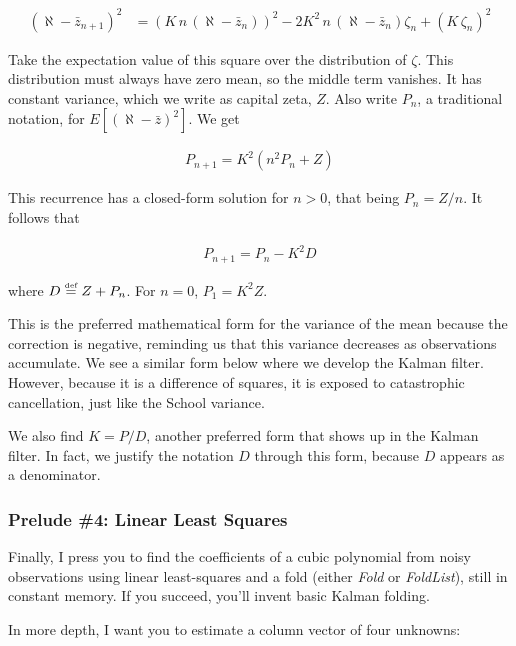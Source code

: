\documentclass[10pt,oneside,x11names]{article}
\begin{document}
\begin{enumerate}
\begin{align*}
(\aleph-\bar{z}_{n+1})^2
&=
\left(
K\, n\, (\aleph - \bar{z}_n)
\right)^2-
2K^2\,n\,(\aleph - \bar{z}_n)\zeta_n+ (K\,\zeta_n)^2
\end{align*}

\noindent Take the expectation value of this square over the distribution of
\(\zeta\). This distribution must always have zero mean, so the middle term
vanishes. It has constant variance, which we write as capital zeta, \(Z\). Also
write \(P_n\), a traditional notation, for \(E\left[(\aleph-\bar{z})^2\right]\). We
get

\begin{align*}
P_{n+1}=K^2(n^2P_n+Z)
\end{align*}

\noindent This recurrence has a closed-form solution for \(n>0\), that being
\(P_n=Z/n\). It follows that

\begin{align*}
P_{n+1}=P_n-K^2D
\end{align*}

where \(D\stackrel{\text{\tiny def}}{=}Z+P_n\). For \(n=0\), \(P_1=K^2Z\). 

This is the preferred mathematical form for the variance of the mean because the
correction is negative, reminding us that this variance decreases as
observations accumulate. We see a similar form below where we develop the Kalman
filter. However, because it is a difference of squares, it is exposed to
catastrophic cancellation, just like the School variance.

We also find \(K=P/D\), another preferred form that shows up in the
Kalman filter. In fact, we justify the notation \(D\) through this form, because
\(D\) appears as a denominator.
\end{enumerate}

\subsubsection{Prelude \#4: Linear Least Squares}
\label{sec:orgheadline16}

Finally, I press you to find the coefficients of a cubic polynomial from
noisy observations using linear least-squares and a fold (either \emph{Fold} or
\emph{FoldList}), still in constant memory. If you succeed, you'll invent basic
Kalman folding.

In more depth, I want you to estimate a column vector of four unknowns:
\end{document}
